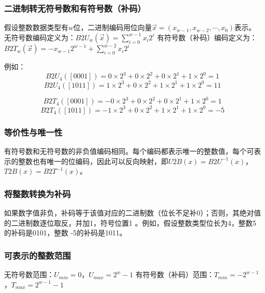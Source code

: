 \subsubsection{二进制转无符号数和有符号数（补码）}
假设整数数据类型有\(w\)位，二进制编码用位向量\(\vec{x}=(x_{w - 1},x_{w - 2},\cdots,x_{0})\)表示。
无符号数编码定义为：\(B2U_{w}(\vec{x})=\sum\limits_{i = 0}^{w - 1}x_{i}2^{i}\)
有符号数（补码）编码定义为：\(B2T_{w}(\vec{x})=-x_{w - 1}2^{w - 1}+\sum\limits_{i = 0}^{w - 2}x_{i}2^{i}\)

例如：
\[B2U_{4}([0001])=0\times2^{3}+0\times2^{2}+0\times2^{1}+1\times2^{0}=1\]
\[B2U_{4}([1011])=1\times2^{3}+0\times2^{2}+1\times2^{1}+1\times2^{0}=11\]

\[B2T_{4}([0001])=-0\times2^{3}+0\times2^{2}+0\times2^{1}+1\times2^{0}=1\]
\[B2T_{4}([1011])=-1\times2^{3}+0\times2^{2}+1\times2^{1}+1\times2^{0}=-5\]

\subsubsection{等价性与唯一性}
有符号数和无符号数的非负值编码相同。每个编码都表示唯一的整数值，每个可表示的整数也有唯一的位编码，因此可以反向映射，即\(U2B(x)=B2U^{-1}(x)\)，\(T2B(x)=B2T^{-1}(x)\)。
\subsubsection{将整数转换为补码}
如果数字值非负，补码等于该值对应的二进制数（位长不足补0）；否则，其绝对值的二进制数逐位取反，并加1，符号位置1 。例如，假设整数类型位长为4，整数5的补码是0101，整数 -5的补码是1011。
\subsubsection{可表示的整数范围}
无符号数范围：\(U_{min}=0\)，\(U_{max}=2^{w}-1\)
有符号数（补码）范围：\(T_{min}=-2^{w - 1}\)，\(T_{max}=2^{w - 1}-1\)
